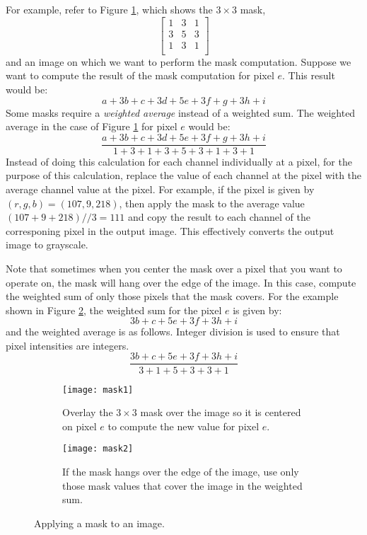 \documentclass[addpoints]{exam}
\begin{document}
For example, refer to Figure \ref{fig:mask-full}, which shows the  $3 \times 3$ mask,
\[
  \left[
    \begin{array}{ccc}
      1 & 3 & 1\\
      3 & 5 & 3\\
      1 & 3 & 1\\
    \end{array}          
  \right]
\]
and an image on which we want to perform the mask computation. Suppose we want to compute the result of the mask computation for pixel $e$. This result would be:
\[
  a + 3b + c + 3d + 5e + 3f + g + 3h + i
\]
Some masks require a \textit{weighted average} instead of a weighted sum. The weighted average in the case of Figure \ref{fig:mask-full} for pixel $e$ would be:
\[
  \frac{a + 3b + c + 3d + 5e + 3f + g + 3h + i} {1 + 3 + 1 + 3 + 5 + 3 + 1 + 3 + 1}
\]
Instead of doing this calculation for each channel individually at a pixel, for the purpose of this calculation, replace the value of each channel at the pixel with the average channel value at the pixel. For example, if the pixel is given by $(r, g, b) = (107, 9, 218)$, then apply the mask to the average value $(107 + 9 + 218)//3 = 111$ and copy the result to each channel of the corresponing pixel in the output image. This effectively converts the output image to grayscale.

Note that sometimes when you center the mask over a pixel that you want to operate on, the mask will hang over the edge of the image. In this case, compute the weighted sum of only those pixels that the mask covers. For the example shown in Figure \ref{fig:mask-hang}, the weighted sum for the pixel $e$ is given by:
\[
  3b + c + 5e + 3f + 3h + i
\]
and the weighted average is as follows. Integer division is used to ensure that pixel intensities are integers.
\[
  \frac{3b + c + 5e + 3f + 3h + i}{3+1+5+3+3+1}
\]

\begin{figure}
  \centering
  \begin{subfigure}{.48\textwidth}
    \texttt{[image: mask1]}
    \caption{Overlay the $3 \times 3$ mask over the image so it is centered on pixel $e$ to compute the new value for pixel $e$.}\label{fig:mask-full}
  \end{subfigure}
  \begin{subfigure}[c]{.48\textwidth}
    \texttt{[image: mask2]}
    \caption{If the mask hangs over the edge of the image, use only those mask values that cover the image in the weighted sum.}\label{fig:mask-hang}
  \end{subfigure}
  \caption{Applying a mask to an image.}
  \label{fig:mask}
\end{figure}
\end{document}
